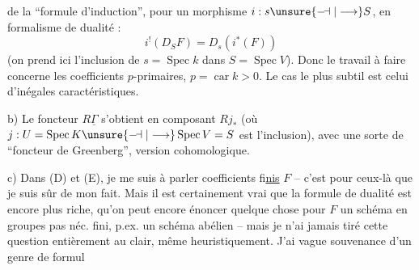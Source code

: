 de la ``formule d'induction'', pour un morphisme $i:s\unsure{\relbar\joinrel\dashv|\longrightarrow}S$, en formalisme de dualité :
\[
 i^!(D_SF)=D_s(i^*(F))
\]
(on prend ici l'inclusion de $s=\operatorname{Spec}k$ dans $S=\operatorname{Spec}V$). Donc le travail à faire concerne les coefficients $p$-primaires, $p=\operatorname{car}k>0$. Le cas le plus subtil est celui d'inégales caractéristiques.

b) Le foncteur $R\underline{\Gamma}$ s'obtient en composant $Rj_*$ (où $j:U=\operatorname{Spec}K\unsure{\relbar\joinrel\dashv|\longrightarrow}\operatorname{Spec}V=S$ est l'inclusion), avec une sorte de ``foncteur de Greenberg'', version cohomologique.

c) Dans (D) et (E), je me suis  à parler  coefficients fi\uline{nis} $F$ -- c'est pour ceux-là que je suis sûr de mon fait. Mais il est certainement vrai que la formule de dualité est encore plus riche, qu'on peut encore énoncer quelque chose  pour  $F$ un schéma en groupes pas néc. fini, p.ex. un schéma abélien  -- mais je n'ai jamais tiré cette question entièrement au clair, même heuristiquement. J'ai  vague souvenance d'un genre de formul
